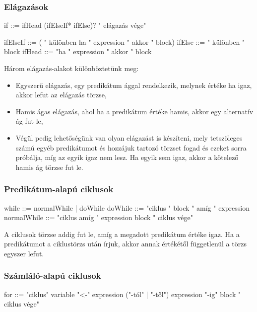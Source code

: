 \subsubsection{Elágazások}

\begin{ebnf}
if ::= ifHead (ifElseIf* ifElse)? " elágazás vége"

ifElseIf ::= ( " különben ha " expression " akkor " block)
ifElse ::= " különben " block
ifHead ::= "ha " expression " akkor " block 
\end{ebnf}

Három elágazás-alakot különböztetünk meg:

\begin{itemize}
    \item Egyszerű elágazás, egy predikátum ággal rendelkezik, melynek értéke ha igaz, akkor lefut az elágazás törzse,
    \item Hamis ágas elágazás, ahol ha a predikátum értéke hamis, akkor egy alternatív ág fut le,
    \item Végül pedig lehetőségünk van olyan elágazást is készíteni, mely tetszőleges számú egyéb predikátumot és hozzájuk tartozó törzset fogad és ezeket sorra próbálja, míg az egyik igaz nem lesz. Ha egyik sem igaz, akkor a kötelező hamis ág törzse fut le.
\end{itemize}

\subsubsection{Predikátum-alapú ciklusok}

\begin{ebnf}
while ::= normalWhile | doWhile
doWhile ::= "ciklus " block " amíg " expression
normalWhile ::= "ciklus amíg " expression block " ciklus vége"
\end{ebnf}

A ciklusok törzse addig fut le, amíg a megadott predikátum értéke igaz. Ha a predikátumot a ciklustörzs után írjuk, akkor annak értékétől függetlenül a törzs egyszer lefut.

\subsubsection{Számláló-alapú ciklusok}

\begin{ebnf}
for ::= "ciklus" variable "<-" expression ("-tól" | "-től") expression "-ig" block " ciklus vége"
\end{ebnf}

